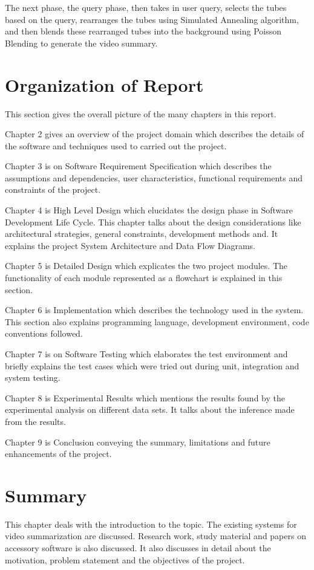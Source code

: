 The next phase, the query phase, then takes in user query, selects the tubes based on the query, rearranges the tubes using Simulated Annealing algorithm, and then blends these rearranged tubes into the background using Poisson Blending to generate the video summary.


\section{Organization of Report}

This section gives the overall picture of the many chapters in this report.

Chapter 2 gives an overview of the project domain which describes the details of the software and techniques used to carried out the project.

Chapter 3 is on Software Requirement Specification which describes the assumptions and dependencies, user characteristics, functional requirements and constraints of the project.

Chapter 4 is High Level Design which elucidates the design phase in Software Development Life Cycle. This chapter talks about the design considerations like architectural strategies, general constraints, development methods and. It explains the project System Architecture and Data Flow Diagrams.

Chapter 5 is Detailed Design which explicates the two project modules. The functionality of each module represented as a flowchart is explained in this section.

Chapter 6 is Implementation which describes the technology used in the system. This section also explains programming language, development environment, code conventions followed.

Chapter 7 is on Software Testing which elaborates the test environment and briefly explains the test cases which were tried out during unit, integration and system testing.

Chapter 8 is Experimental Results which mentions the results found by the experimental analysis on different data sets. It talks about the inference made from the results.

Chapter 9 is Conclusion conveying the summary, limitations and future enhancements of the project.


\section{Summary}

This chapter deals with the introduction to the topic. The existing systems for video summarization are discussed. Research work, study material and papers on accessory software is also discussed. It also discusses in detail about the motivation, problem statement and the objectives of the project.